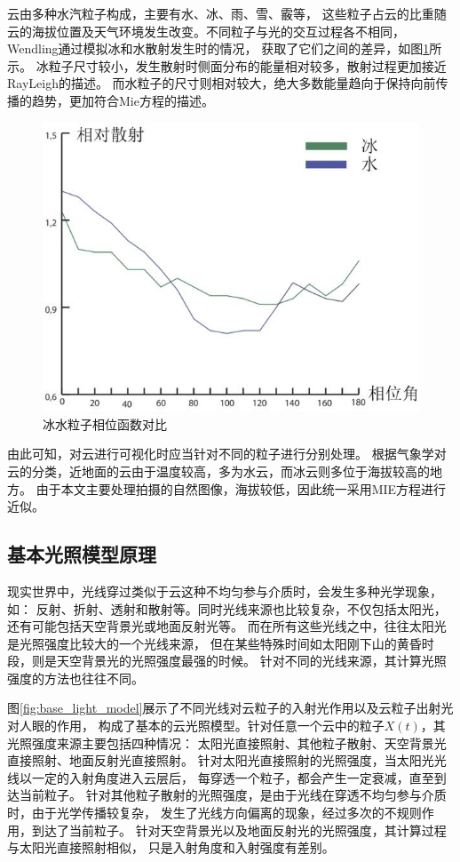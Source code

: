 云由多种水汽粒子构成，主要有水、冰、雨、雪、霰等，
这些粒子占云的比重随云的海拔位置及天气环境发生改变。不同粒子与光的交互过程各不相同，
Wendling通过模拟冰和水散射发生时的情况，
获取了它们之间的差异，如图\ref{fig:ice_water_phase_function}所示。
冰粒子尺寸较小，发生散射时侧面分布的能量相对较多，散射过程更加接近RayLeigh的描述。
而水粒子的尺寸则相对较大，绝大多数能量趋向于保持向前传播的趋势，更加符合Mie方程的描述。
\begin{figure}
\centering
\includegraphics{figure/ice_water_phase_function.jpg}
\caption{冰水粒子相位函数对比}
\label{fig:ice_water_phase_function}
\end{figure}

由此可知，对云进行可视化时应当针对不同的粒子进行分别处理。
根据气象学对云的分类，近地面的云由于温度较高，多为水云，而冰云则多位于海拔较高的地方。
由于本文主要处理拍摄的自然图像，海拔较低，因此统一采用MIE方程进行近似。

\subsection{基本光照模型原理}

现实世界中，光线穿过类似于云这种不均匀参与介质时，会发生多种光学现象，如：
反射、折射、透射和散射等。同时光线来源也比较复杂，不仅包括太阳光，
还有可能包括天空背景光或地面反射光等。
而在所有这些光线之中，往往太阳光是光照强度比较大的一个光线来源，
但在某些特殊时间如太阳刚下山的黄昏时段，则是天空背景光的光照强度最强的时候。
针对不同的光线来源，其计算光照强度的方法也往往不同。

图\ref{fig:base_light_model}展示了不同光线对云粒子的入射光作用以及云粒子出射光对人眼的作用，
构成了基本的云光照模型。针对任意一个云中的粒子$X(t)$，其光照强度来源主要包括四种情况：
太阳光直接照射、其他粒子散射、天空背景光直接照射、地面反射光直接照射。
针对太阳光直接照射的光照强度，当太阳光光线以一定的入射角度进入云层后，
每穿透一个粒子，都会产生一定衰减，直至到达当前粒子。
针对其他粒子散射的光照强度，是由于光线在穿透不均匀参与介质时，由于光学传播较复杂，
发生了光线方向偏离的现象，经过多次的不规则作用，到达了当前粒子。
针对天空背景光以及地面反射光的光照强度，其计算过程与太阳光直接照射相似，
只是入射角度和入射强度有差别。

